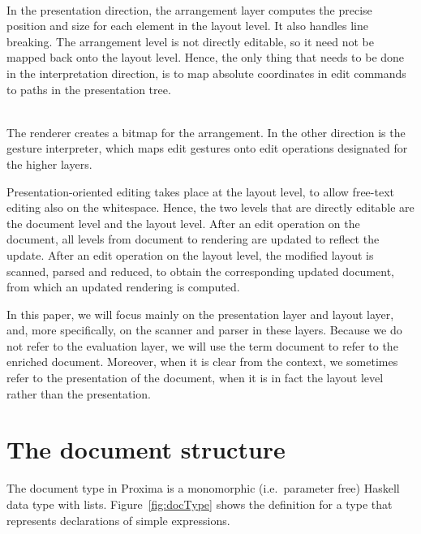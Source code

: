 \documentclass[12pt]{article}
\begin{document}
\\
In the presentation direction, the arrangement layer computes the precise position and size for each element in the layout level. It also handles line breaking. The arrangement level is not directly editable, so it need not be mapped back onto the layout level. Hence, the only thing that needs to be done in the interpretation direction, is to map absolute coordinates in edit commands to paths in the presentation tree. 

\\
The renderer creates a bitmap for the arrangement. In the other direction is the gesture interpreter, which maps edit gestures onto edit operations designated for the higher layers.


Presentation-oriented editing takes place at the layout level, to allow  free-text editing also on the whitespace. Hence, the two levels that are directly editable are the document level and the layout level. After an edit operation on the document, all levels from document to rendering are updated to reflect the update. After an edit operation on the layout level, the modified layout is scanned, parsed and reduced, to obtain the corresponding updated document, from which an updated rendering is computed.

In this paper, we will focus mainly on the presentation layer and layout layer, and, more specifically, on the scanner and parser in these layers. Because we do not refer to the evaluation layer, we will use the term document to refer to the enriched document. Moreover, when it is clear from the context, we sometimes refer to the presentation of the document, when it is in fact the layout level rather than the presentation.



%
\section{The document structure}\label{sect:documentStructure}
%

The document type in Proxima is a monomorphic (i.e.\ parameter free) Haskell data type with lists. Figure~\ref{fig:docType} shows the definition for a type  that represents declarations of simple expressions. 
\end{document}
